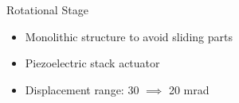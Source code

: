 \documentclass[10pt]{beamer}
\begin{document}
\begin{frame}{Rotational Stage}
  \begin{itemize}
    \item Monolithic structure to avoid sliding parts
    \item Piezoelectric stack actuator
    \item Displacement range: \unit{30}{\micro\meter} $\implies$ 20 mrad
  \end{itemize}

  \begin{figure}[h!]
    \centering %
    \qquad
  \end{figure}
\end{frame}

\end{document}
